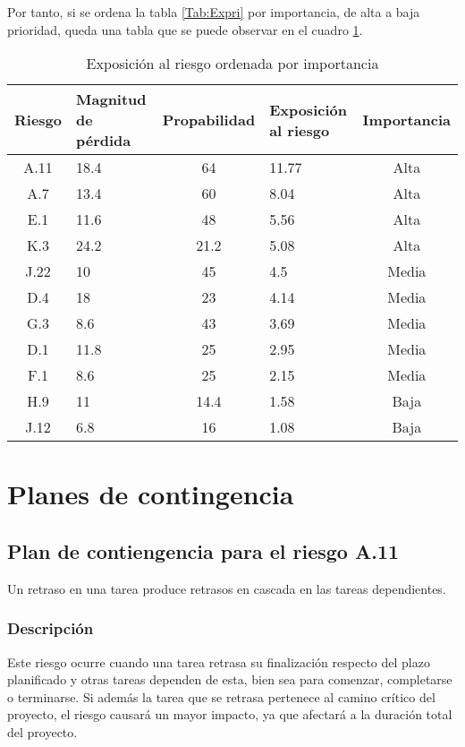 \documentclass[11pt,a4paper,spanish,twoside]{report}
\begin{document}
Por tanto, si se ordena la tabla \ref{Tab:Expri} por importancia, de alta a
baja prioridad, queda una tabla que se puede observar en el cuadro
\ref{Tab:Expor}.


\begin{table}[!h]
  \centering
  \begin{tabular}{|c||p{}||c||p{}||c|}
    \hline
    \textbf{Riesgo} & \textbf{Magnitud de pérdida} & \textbf{Propabilidad} & 
    \textbf{Exposición al riesgo} & \textbf{Importancia} \\
    \hline \hline
    A.11 & 18.4 & 64 & 11.77 & Alta \\ 
    \hline
    A.7 & 13.4 & 60 & 8.04 & Alta \\
    \hline 
    E.1 & 11.6 & 48 & 5.56 & Alta \\
    \hline
    K.3 & 24.2 & 21.2 & 5.08 & Alta \\
    \hline
    J.22 & 10 & 45 & 4.5 & Media \\
    \hline
    D.4 & 18 & 23 & 4.14 & Media \\
    \hline
    G.3 & 8.6 & 43 & 3.69 & Media \\
    \hline
    D.1 & 11.8 & 25 & 2.95 & Media \\
    \hline
    F.1 & 8.6 & 25 & 2.15 & Media \\
    \hline
    H.9 & 11 & 14.4 & 1.58 & Baja \\
    \hline
    J.12 & 6.8 & 16 & 1.08 & Baja \\
    \hline
  \end{tabular}
  \caption{Exposición al riesgo ordenada por importancia} 
  \label{Tab:Expor}
\end{table}

\chapter{Planes de contingencia}
\section{Plan de contiengencia para el riesgo A.11}
Un retraso en una tarea produce retrasos en cascada en las tareas dependientes.

\subsection{Descripción}
Este riesgo ocurre cuando una tarea retrasa su finalización respecto del plazo
planificado y otras tareas dependen de esta, bien sea para comenzar, 
completarse o terminarse. Si además la tarea que se retrasa pertenece al camino
crítico del proyecto, el riesgo causará un mayor impacto, ya que afectará
a la duración total del proyecto.
\end{document}
